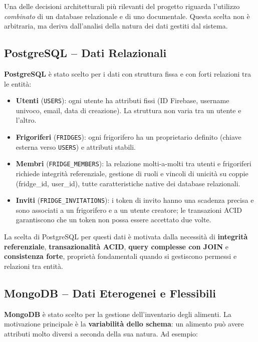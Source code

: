 \documentclass[12pt,a4paper,twoside]{report}
\begin{document}
Una delle decisioni architetturali più rilevanti del progetto riguarda l'utilizzo \textit{combinato} di un database relazionale e di uno documentale. Questa scelta non è arbitraria, ma deriva dall'analisi della natura dei dati gestiti dal sistema.

\subsection{PostgreSQL -- Dati Relazionali}

\textbf{PostgreSQL} è stato scelto per i dati con struttura fissa e con forti relazioni tra le entità:

\begin{itemize}
  \item \textbf{Utenti} (\texttt{USERS}): ogni utente ha attributi fissi (ID Firebase, username univoco, email, data di creazione). La struttura non varia tra un utente e l'altro.
  \item \textbf{Frigoriferi} (\texttt{FRIDGES}): ogni frigorifero ha un proprietario definito (chiave esterna verso \texttt{USERS}) e attributi stabili.
  \item \textbf{Membri} (\texttt{FRIDGE\_MEMBERS}): la relazione molti-a-molti tra utenti e frigoriferi richiede integrità referenziale, gestione di ruoli e vincoli di unicità su coppie (fridge\_id, user\_id), tutte caratteristiche native dei database relazionali.
  \item \textbf{Inviti} (\texttt{FRIDGE\_INVITATIONS}): i token di invito hanno una scadenza precisa e sono associati a un frigorifero e a un utente creatore; le transazioni ACID garantiscono che un token non possa essere accettato due volte.
\end{itemize}

La scelta di PostgreSQL per questi dati è motivata dalla necessità di \textbf{integrità referenziale}, \textbf{transazionalità ACID}, \textbf{query complesse con JOIN} e \textbf{consistenza forte}, proprietà fondamentali quando si gestiscono permessi e relazioni tra entità.

\subsection{MongoDB -- Dati Eterogenei e Flessibili}

\textbf{MongoDB} è stato scelto per la gestione dell'inventario degli alimenti. La motivazione principale è la \textbf{variabilità dello schema}: un alimento può avere attributi molto diversi a seconda della sua natura. Ad esempio:
\end{document}

